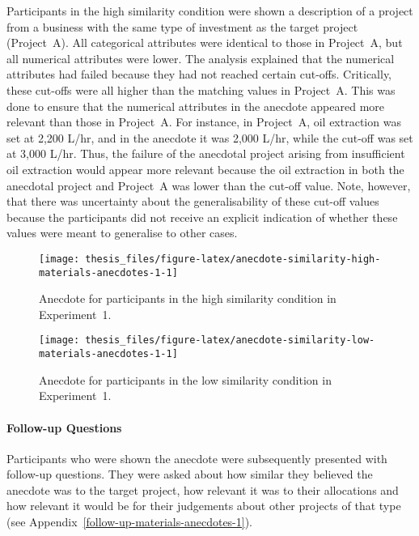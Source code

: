 \documentclass[a4paper, nobind]{templates/ociamthesis}
\theoremstyle{definition}
\theoremstyle{definition}
\theoremstyle{definition}
\theoremstyle{definition}
\theoremstyle{remark}
\begin{document}
Participants in the high similarity condition were shown a description of a
project from a business with the same type of investment as the target project
(Project~A). All categorical attributes were identical to those in Project~A,
but all numerical attributes were lower. The analysis explained that the
numerical attributes had failed because they had not reached certain cut-offs.
Critically, these cut-offs were all higher than the matching values in
Project~A. This was done to ensure that the numerical attributes in the anecdote
appeared more relevant than those in Project~A. For instance, in Project~A, oil
extraction was set at 2,200 L/hr, and in the anecdote it was 2,000 L/hr, while
the cut-off was set at 3,000 L/hr. Thus, the failure of the anecdotal project
arising from insufficient oil extraction would appear more relevant because the
oil extraction in both the anecdotal project and Project~A was lower than the
cut-off value. Note, however, that there was uncertainty about the
generalisability of these cut-off values because the participants did not
receive an explicit indication of whether these values were meant to generalise
to other cases.



\begin{figure}
\texttt{[image: thesis\_files/figure-latex/anecdote-similarity-high-materials-anecdotes-1-1]} \caption{Anecdote for participants in the high similarity condition in Experiment~1.}\label{fig:anecdote-similarity-high-materials-anecdotes-1}
\end{figure}



\begin{figure}
\texttt{[image: thesis\_files/figure-latex/anecdote-similarity-low-materials-anecdotes-1-1]} \caption{Anecdote for participants in the low similarity condition in Experiment~1.}\label{fig:anecdote-similarity-low-materials-anecdotes-1}
\end{figure}

\paragraph{Follow-up Questions}

Participants who were shown the anecdote were subsequently presented with
follow-up questions. They were asked about how similar they believed the
anecdote was to the target project, how relevant it was to their allocations and
how relevant it would be for their judgements about other projects of that type
(see Appendix~\ref{follow-up-materials-anecdotes-1}).
\end{document}
